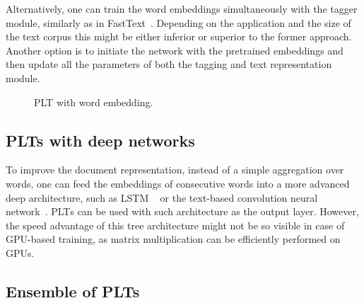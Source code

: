 \documentclass{article}
\newcommand{\Algo}[1]{\textsc{#1}}
\newcommand{\sectionBefore}{-0pt}
\newcommand{\sectionAfter}{-0pt}
\begin{document}
{Alternatively, one can train the word embeddings simultaneously with the tagger module, similarly as in FastText~\citep{Joulin_et_al_2016}. Depending on the application and the size of the text corpus this might be either inferior or superior to the former approach. Another option is to initiate the network with the pretrained embeddings and then update all the parameters of both the tagging and text representation module. 

\begin{figure}
	\begin{center}
		
	\end{center}
	\caption{PLT with word embedding.}
	\label{pic:model-embedding}
\end{figure}



\vspace{\sectionBefore}
\subsection{PLTs with deep networks}
\label{sec:plt-deep}
\vspace{\sectionAfter}

To improve the document representation, instead of a simple aggregation over words, one can feed the embeddings of consecutive words into a more advanced deep architecture, such as LSTM ~\citep{Hochreiter_Schmidhuber_1997} or the text-based convolution neural network~\cite{Liu_et_al_2017}. \Algo{PLT}s can be used with such architecture as the output layer. However, the speed advantage of this tree architecture might not be so visible in case of GPU-based training, as matrix multiplication can be efficiently performed on GPUs. 

\vspace{\sectionBefore}
\subsection{Ensemble of PLTs}
\label{sec:plt-ensemble}
\vspace{\sectionAfter}

}
\end{document}
